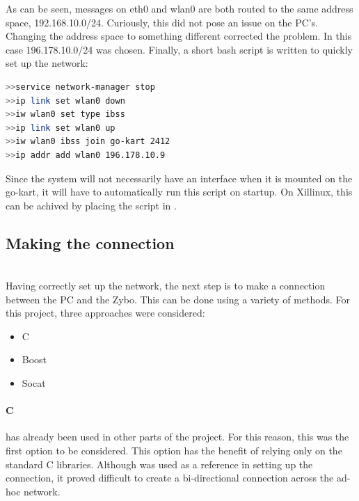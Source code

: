 As can be seen, messages on eth0 and wlan0 are both routed to the same address space, 192.168.10.0/24.
Curiously, this did not pose an issue on the PC's.
Changing the address space to something different corrected the problem.
In this case 196.178.10.0/24 was chosen.
Finally, a short bash script is written to quickly set up the network:
\begin{lstlisting}[language=bash]
>>service network-manager stop
>>ip link set wlan0 down
>>iw wlan0 set type ibss
>>ip link set wlan0 up
>>iw wlan0 ibss join go-kart 2412
>>ip addr add wlan0 196.178.10.9
\end{lstlisting}
Since the system will not necessarily have an interface when it is mounted on the go-kart, it will have to automatically run this script on startup.
On Xillinux, this can be achived by placing the script in .

\subsection{Making the connection}~\\
Having correctly set up the network, the next step is to make a connection between the PC and the Zybo.
This can be done using a variety of methods.
For this project, three approaches were considered:

\begin{itemize}
	\item C
	\item Boost
	\item Socat
\end{itemize}


\paragraph*{C}has already been used in other parts of the project.
For this reason, this was the first option to be considered.
This option has the benefit of relying only on the standard C libraries.
Although \cite{beej} was used as a reference in setting up the connection, it proved difficult to create a bi-directional connection across the ad-hoc network.

